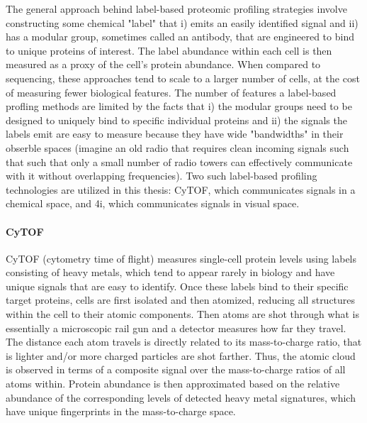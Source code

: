 The general approach behind label-based proteomic profiling strategies involve constructing some chemical "label" that i) emits an easily identified signal and ii) has a modular group, sometimes called an antibody, that are engineered to bind to unique proteins of interest.
The label abundance within each cell is then measured as a proxy of the cell's protein abundance.
When compared to sequencing, these approaches tend to scale to a larger number of cells, at the cost of measuring fewer biological features.
The number of features a label-based profling methods are limited by the facts that i) the modular groups need to be designed to uniquely bind to specific individual proteins and ii) the signals the labels emit are easy to measure because they have wide "bandwidths" in their obserble spaces
(imagine an old radio that requires clean incoming signals such that such that only a small number of radio towers can effectively communicate with it without overlapping frequencies).
Two such label-based profiling technologies are utilized in this thesis:
CyTOF, which communicates signals in a chemical space, and 4i, which communicates signals in visual space.

\paragraph{CyTOF}
CyTOF (cytometry time of flight) \cite{bandura2009,bendall2011}
measures single-cell protein levels using labels consisting of heavy metals, which tend to appear rarely in biology and have unique signals that are easy to identify.
Once these labels bind to their specific target proteins, cells are first isolated and then atomized, reducing all structures within the cell to their atomic components.
Then atoms are shot through what is essentially a microscopic rail gun and a detector measures how far they travel.
The distance each atom travels is directly related to its mass-to-charge ratio, that is lighter and/or more charged particles are shot farther.
Thus, the atomic cloud is observed in terms of a composite signal over the mass-to-charge ratios of all atoms within.
Protein abundance is then approximated based on the relative abundance of the corresponding levels of detected heavy metal signatures,
which have unique fingerprints in the mass-to-charge space.

